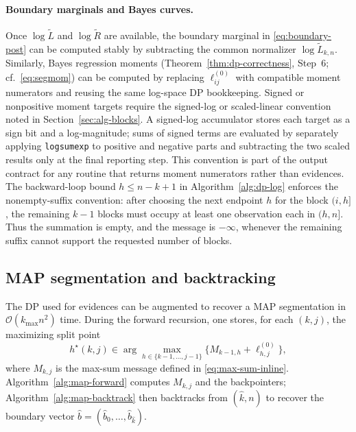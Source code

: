 \paragraph{Boundary marginals and Bayes curves.}
Once $\log\widetilde{L}$ and $\log\widetilde{R}$ are available, the boundary marginal in
\eqref{eq:boundary-post} can be computed stably by subtracting the common normalizer
$\log\widetilde{L}_{k,n}$.
Similarly, Bayes regression moments (Theorem~\ref{thm:dp-correctness}, Step~6; cf.\ \eqref{eq:segmom})
can be computed by replacing $\ell^{(0)}_{ij}$ with compatible moment numerators and reusing the
same log-space DP bookkeeping. Signed or nonpositive moment targets require the signed-log or
scaled-linear convention noted in Section~\ref{sec:alg-blocks}.
A signed-log accumulator stores each target as a sign bit and a log-magnitude; sums of signed
terms are evaluated by separately applying \texttt{logsumexp} to positive and negative parts
and subtracting the two scaled results only at the final reporting step. This convention is part
of the output contract for any routine that returns moment numerators rather than evidences.
The backward-loop bound $h\le n-k+1$ in Algorithm~\ref{alg:dp-log} enforces the nonempty-suffix
convention: after choosing the next endpoint $h$ for the block $(i,h]$, the remaining $k-1$
blocks must occupy at least one observation each in $(h,n]$. Thus the summation is empty, and the
message is $-\infty$, whenever the remaining suffix cannot support the requested number of blocks.

\subsection{MAP segmentation and backtracking}
\label{sec:alg-map}

The DP used for evidences can be augmented to recover a MAP segmentation in
$\mathcal{O}(k_{\max}n^2)$ time.
During the forward recursion, one stores, for each $(k,j)$, the maximizing split point
\begin{equation}
    h^\star(k,j)\in\arg\max_{h\in\{k-1,\dots,j-1\}} \Big\{M_{k-1,h}+\ell^{(0)}_{h,j}\Big\},
    \label{eq:map-backpointer}
\end{equation}
where $M_{k,j}$ is the max-sum message defined in \eqref{eq:max-sum-inline}.
Algorithm~\ref{alg:map-forward} computes $M_{k,j}$ and the backpointers; Algorithm~\ref{alg:map-backtrack} then backtracks from $(\widehat{k},n)$ to recover the boundary vector
$\widehat{b}=(\widehat{b}_0,\dots,\widehat{b}_{\widehat{k}})$.

